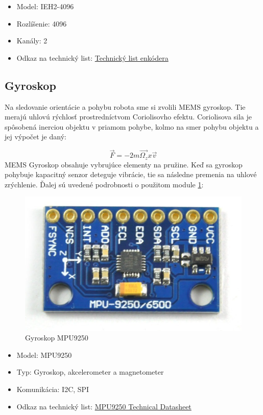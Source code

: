 \begin{itemize}
  \item Model: IEH2-4096
  \item Rozlíšenie: 4096
  \item Kanály: 2
  \item Odkaz na technický list: \href{https://www.faulhaber.com/fileadmin/Import/Media/EN_IEH2-4096_DFF.pdf}{Technický list enkódera}
\end{itemize}

\subsection{Gyroskop}

Na sledovanie orientácie a pohybu robota sme si zvolili MEMS gyroskop. Tie merajú uhlovú rýchlosť prostredníctvom Coriolisovho efektu. Coriolisova sila je spôsobená inerciou objektu v priamom pohybe, kolmo na smer pohybu objektu a jej výpočet je daný: 

\begin{equation}
\label{enc_eq}
\vec{F} = -2m\vec{\Omega_z}x\vec{v}
\end{equation}
MEMS Gyroskop obsahuje vybrujúce elementy na pružine. Keď sa gyroskop pohybuje kapacitný senzor deteguje vibrácie, tie sa následne premenia na uhlové zrýchlenie.
    \newpage
Ďalej sú uvedené podrobnosti o použitom module \ref{fig:gyro}:
\begin{figure}[!htbp]
        \centering
        \includegraphics[scale=0.8]{includes/images/mpu9205.png}
        \caption{Gyroskop MPU9250}
        \label{fig:gyro}
\end{figure}
\begin{itemize}
  \item Model: MPU9250
  \item Typ: Gyroskop, akcelerometer a magnetometer
  \item Komunikácia: I2C, SPI
  \item Odkaz na technický list: \href{https://www.invensense.com/products/motion-tracking/9-axis/mpu-9250/}{MPU9250 Technical Datasheet}
\end{itemize}
